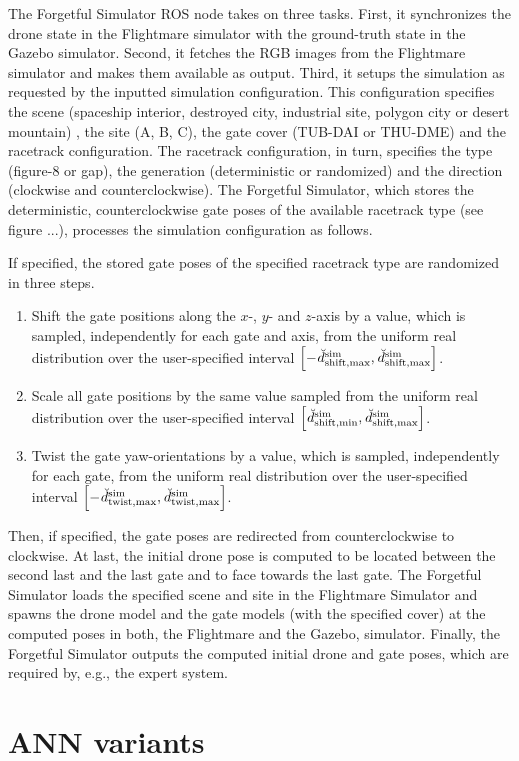 The Forgetful Simulator ROS node takes on three tasks.
First, it synchronizes the
drone state in the Flightmare simulator with the
ground-truth state in the Gazebo simulator.
Second, it fetches the RGB images from the Flightmare simulator
and makes them available as output.
Third, it setups the simulation
as requested by the inputted 
simulation configuration.
This configuration specifies the scene
(spaceship interior,
destroyed city,
industrial site,
polygon city or
desert mountain)
, the site (A, B, C),
the gate cover (TUB-DAI or THU-DME) and the racetrack configuration.
The racetrack configuration, in turn, specifies 
the type (figure-8 or gap), the generation (deterministic or randomized) 
and the direction (clockwise and counterclockwise).
The Forgetful Simulator, 
which stores the deterministic, 
counterclockwise gate poses
of the available racetrack type (see figure ...), 
processes the simulation configuration as follows.

If specified, 
the stored gate poses of the specified racetrack type are randomized in three steps.
\begin{enumerate}
    \item Shift the gate positions along the $x$-, $y$- and $z$-axis
    by a value, which is sampled, 
    independently for each gate and axis, 
    from the uniform real distribution
    over the user-specified interval 
    $\left[
        -\dist[\user]{\text{sim}}{\text{shift},\mxm}{}{},
        \dist[\user]{\text{sim}}{\text{shift},\mxm}{}{}\right]$.
    \item Scale all gate positions by the same value
    sampled from the uniform real distribution
    over the user-specified interval
    $\left[
        \dist[\user]{\text{sim}}{\text{shift},\mnm}{}{}, 
        \dist[\user]{\text{sim}}{\text{shift},\mxm}{}{}\right]$.
    \item Twist the gate yaw-orientations
    by a value, which is sampled, 
    independently for each gate, 
    from the uniform real distribution
    over the user-specified interval
    $\left[
        -\dist[\user]{\text{sim}}{\text{twist},\mxm}{}{},
        \dist[\user]{\text{sim}}{\text{twist},\mxm}{}{}\right]$.
\end{enumerate}
Then, if specified, the gate poses are redirected 
from counterclockwise to clockwise.
At last, the initial drone pose is computed to be located between
the second last and the last gate and to face towards the last gate.
The Forgetful Simulator loads the specified scene and site in 
the Flightmare Simulator
and spawns the drone model 
and the gate models (with the specified cover)
at the computed poses
in both, the Flightmare and the Gazebo, simulator.
Finally, the Forgetful Simulator
outputs the computed initial drone and gate poses,
which are required by, e.g., the expert system.













\section{ANN variants}







\section{}